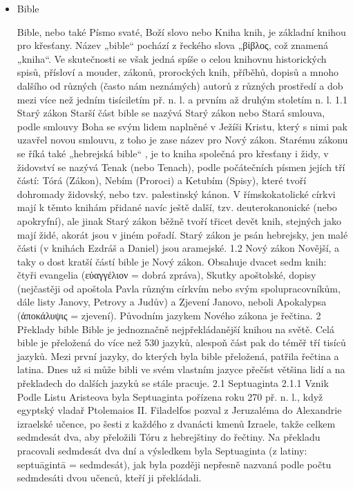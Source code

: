 \documentclass[letterpaper,12pt,oneside]{article}
\begin{document}
\newpage

\clearpage

\begin{itemize}
\item{Bible}

Bible, nebo také Písmo svaté, Boží slovo nebo Kniha knih, je základní knihou pro křesťany. Název „bible“ pochází z řeckého slova „\textgreek{βἰβλος}, což znamená „kniha“. Ve skutečnosti se však jedná spíše o celou knihovnu historických spisů, přísloví a mouder, zákonů, prorockých knih, příběhů, dopisů a mnoho dalšího od různých (často nám neznámých) autorů z různých prostředí a dob mezi více než jedním tisíciletím př. n. l. a prvním až druhým stoletím n. l.
1.1	Starý zákon
Starší část bible se nazývá Starý zákon nebo Stará smlouva, podle smlouvy Boha se svým lidem naplněné v Ježíši Kristu, který s nimi pak uzavřel novou smlouvu, z toho je zase název pro Nový zákon.
Starému zákonu se říká také „hebrejská bible“ , je to kniha společná pro křesťany i židy, v židovství se nazývá Tenak (nebo Tenach), podle počátečních písmen jejích tří částí: Tórá (Zákon), Nebím (Proroci) a Ketubím (Spisy),  které tvoří dohromady židovský, nebo tzv. palestinský kánon. V římskokatolické církvi mají k těmto knihám přidané navíc ještě další, tzv. deuterokanonické (nebo apokryfní), ale jinak Starý zákon běžně tvoří třicet devět knih, stejných jako mají židé, akorát jsou v jiném pořadí.
Starý zákon je psán hebrejsky, jen malé části (v knihách Ezdráš a Daniel) jsou aramejské.
1.2	Nový zákon
Novější, a taky o dost kratší částí bible je Nový zákon. Obsahuje dvacet sedm knih: čtyři evangelia (\textgreek{εὐαγγέλιον} = dobrá zpráva), Skutky apoštolské, dopisy (nejčastěji od apoštola Pavla různým církvím nebo svým spolupracovníkům, dále listy Janovy, Petrovy a Judův) a Zjevení Janovo, neboli Apokalypsa (\textgreek{ἀποκάλυψις} = zjevení). Původním jazykem Nového zákona je řečtina.
2	Překlady bible
Bible je jednoznačně nejpřekládanější knihou na světě. Celá bible je přeložená do více než 530 jazyků, alespoň část pak do téměř tří tisíců jazyků.  
Mezi první jazyky, do kterých byla bible přeložená, patřila řečtina a latina. Dnes už si může bibli ve svém vlastním jazyce přečíst většina lidí a na překladech do dalších jazyků se stále pracuje.
2.1	Septuaginta
2.1.1	Vznik
Podle Listu Aristeova byla Septuaginta pořízena roku 270 př. n. l., když egyptský vladař Ptolemaios II. Filadelfos pozval z Jeruzaléma do Alexandrie izraelské učence, po šesti z každého z dvanácti kmenů Izraele, takže celkem sedmdesát dva, aby přeložili Tóru z hebrejštiny do řečtiny.  Na překladu pracovali sedmdesát dva dní a výsledkem byla Septuaginta (z latiny: septuāgintā = sedmdesát), jak byla později nepřesně nazvaná podle počtu sedmdesáti dvou učenců, kteří ji překládali.

\end{itemize}
\end{document}
